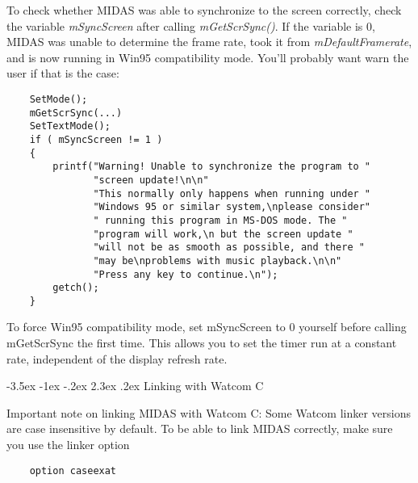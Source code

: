 \documentclass[a4paper,12pt,oneside]{book}
\makeatletter
\renewcommand\section{\@startsection {section}{1}{-20pt}%
                                   {-3.5ex \@plus -1ex \@minus -.2ex}%
                                   {2.3ex \@plus.2ex}%
                                   {\normalfont\Large\bfseries}}
\makeatother
\begin{document}
To check whether MIDAS was able to synchronize to the screen correctly, check
the variable {\em mSyncScreen} after calling {\em mGetScrSync()}. If the
variable is 0, MIDAS was unable to determine the frame rate, took it from
{\em mDefaultFramerate}, and is now running in Win95 compatibility mode.
You'll probably want warn the user if that is the case:

\begin{verbatim}
    SetMode();
    mGetScrSync(...)
    SetTextMode();
    if ( mSyncScreen != 1 )
    {
        printf("Warning! Unable to synchronize the program to "
               "screen update!\n\n"
               "This normally only happens when running under "
               "Windows 95 or similar system,\nplease consider"
               " running this program in MS-DOS mode. The "
               "program will work,\n but the screen update "
               "will not be as smooth as possible, and there "
               "may be\nproblems with music playback.\n\n"
               "Press any key to continue.\n");
        getch();
    }
\end{verbatim}

To force Win95 compatibility mode, set mSyncScreen to 0 yourself before
calling mGetScrSync the first time. This allows you to set the timer run at a
constant rate, independent of the display refresh rate.


\section{Linking with Watcom C}

Important note on linking MIDAS with Watcom C: Some Watcom linker versions
are case insensitive by default. To be able to link MIDAS correctly, make
sure you use the linker option

\begin{verbatim}
    option caseexat
\end{verbatim}
\end{document}
